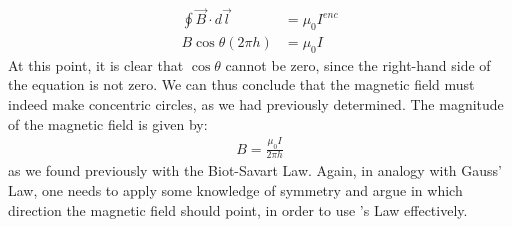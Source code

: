 \begin{align*}
\oint \vec B \cdot d\vec l &=\mu_0 I^{enc}\\
B\cos\theta (2\pi h) &= \mu_0 I
\end{align*} 
At this point, it is clear that $\cos\theta$ cannot be zero, since the right-hand side of the equation is not zero. We can thus conclude that the magnetic field must indeed make concentric circles, as we had previously determined. The magnitude of the magnetic field is given by:
\begin{align*}
B = \frac{\mu_0 I}{2\pi h}
\end{align*}
as we found previously with the Biot-Savart Law. Again, in analogy with Gauss' Law, one needs to apply some knowledge of symmetry and argue in which direction the magnetic field should point, in order to use \ampere's Law effectively. 

